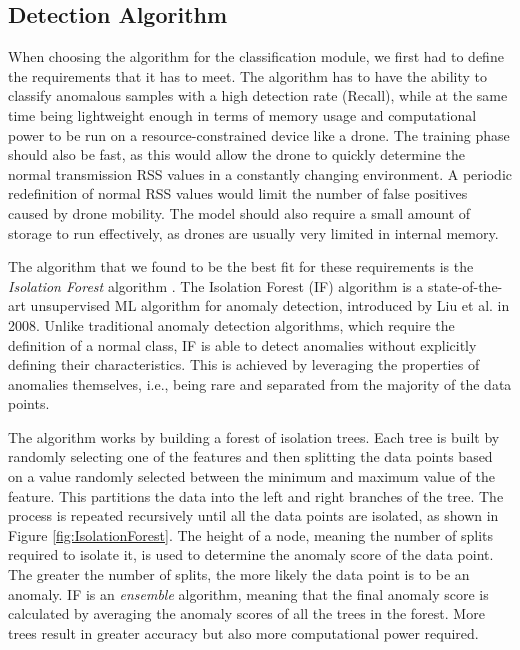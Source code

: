 \documentclass[futureinternet,article,submit,pdftex,moreauthors]{Definitions/mdpi}
\begin{document}
\subsection {Detection Algorithm}

When choosing the algorithm for the classification module, we first had to define the requirements that it has to meet. The algorithm has to have the ability to classify anomalous samples with a high detection rate (Recall), while at the same time 
being lightweight enough in terms of memory usage and computational power to be run on a resource-constrained device like a drone. The training phase should also be fast, as this would allow the drone to quickly determine the normal transmission RSS values in a constantly changing environment. A periodic redefinition of normal RSS values would 
limit the number of false positives caused by drone mobility. 
The model should also require a small amount of storage to run effectively, as drones are usually very limited in internal memory. 

The algorithm that we found to be the best fit for these requirements is the \textit{Isolation Forest} algorithm \cite{IsolationForestLiu}. The Isolation Forest (IF) algorithm is a state-of-the-art unsupervised ML algorithm for anomaly detection, introduced by Liu et al. in 2008. 
Unlike traditional anomaly detection algorithms, which require the definition of a normal class, IF is able to detect anomalies without explicitly defining their characteristics.
This is achieved by leveraging the properties of anomalies themselves, i.e., being rare and separated from the majority of the data points. 

The algorithm works by building a forest of isolation trees. Each tree is built by randomly selecting one of the features and then splitting the data points based on a value randomly selected between the minimum and maximum value of the feature. This partitions the data into the 
left and right branches of the tree. The process is repeated recursively until all the data points are isolated, as shown in Figure \ref{fig:IsolationForest}. The height of a node, meaning the number of splits required to isolate it, is used to determine the anomaly score of the data point. The greater the number of splits, the more likely the data point is to be an anomaly.
IF is an \textit{ensemble} algorithm, meaning that the final anomaly score is calculated by averaging the anomaly scores of all the trees in the forest. More trees result in greater accuracy but also more computational power required.
\end{document}
